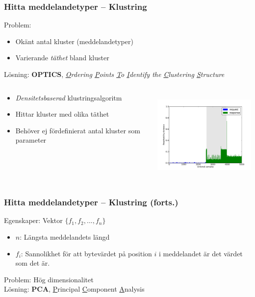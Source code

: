 \documentclass[xetex]{beamer}
\begin{document}
    \begin{frame}
        \frametitle{Hitta meddelandetyper -- Klustring}
        Problem:
        \begin{itemize}
            \item Okänt antal kluster (meddelandetyper)
            \item Varierande \emph{täthet} bland kluster
        \end{itemize}
        Lösning: \textbf{OPTICS}, \scriptsize{
            \emph{\underline{O}rdering \underline{P}oints \underline{T}o
                  \underline{I}dentify the \underline{C}lustering 
                  \underline{S}tructure}}
        \vskip20pt
        \begin{columns}[t]
            \begin{column}[T]{6cm}
                \begin{itemize}
                    \item \emph{Densitetsbaserad} klustringsalgoritm
                    \item Hittar kluster med olika täthet
                    \item Behöver ej fördefinierat antal kluster som parameter
                \end{itemize}
            \end{column}
            \begin{column}[T]{6cm}
                \includegraphics[height=4.5cm]{img/hierextr.pdf}
            \end{column}
        \end{columns}
    \end{frame}
    \begin{frame}
        \frametitle{Hitta meddelandetyper -- Klustring (forts.)}
        Egenskaper: Vektor $\{f_1, f_2, ..., f_n\}$
        \begin{itemize}
            \item $n$: Längsta meddelandets längd
            \item $f_i$: Sannolikhet för att bytevärdet på position $i$ i
                meddelandet är det värdet som det är.
        \end{itemize}
        \vskip20pt
        Problem: Hög dimensionalitet \\
        Lösning: \textbf{PCA}, \scriptsize{\underline{P}rincipal
            \underline{C}omponent \underline{A}nalysis}
    \end{frame}
\end{document}
